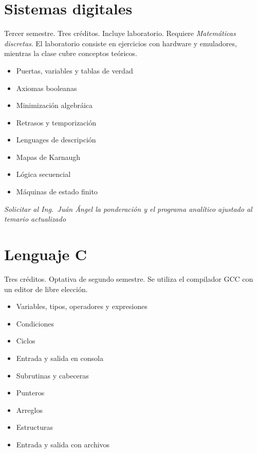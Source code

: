 \documentclass{article}
\begin{document}
\begin{multicols}{4}
\vfill\null \columnbreak

\hypertarget{sd}{\section*{Sistemas digitales}}

Tercer semestre. Tres cr\'{e}ditos. Incluye laboratorio. Requiere {\em
  Matem\'{a}ticas discretas}. El laboratorio consiste en ejercicios
con hardware y emuladores, mientras la clase cubre conceptos te\'{o}ricos.

\begin{itemize}
\item{Puertas, variables y tablas de verdad}
\item{Axiomas booleanas}
\item{Minimizaci\'{o}n algebr\'{a}ica}
\item{Retrasos y temporizaci\'{o}n}
\item{Lenguages de descripci\'{o}n}
\item{Mapas de Karnaugh}
\item{L\'{o}gica secuencial}
\item{M\'{a}quinas de estado finito}
\end{itemize}

{\em Solicitar al Ing.\ Ju\'{a}n \'{A}ngel la ponderaci\'{o}n y el programa
  anal\'{i}tico ajustado al temario actualizado}

\newpage

\hypertarget{lac}{\section*{Lenguaje C}}

Tres cr\'{e}ditos. Optativa de segundo semestre. Se utiliza el
compilador GCC con un editor de libre elecci\'{o}n.

\begin{itemize}
\item{Variables, tipos, operadores y expresiones}
\item{Condiciones}
\item{Ciclos}
\item{Entrada y salida en consola}
\item{Subrutinas y cabeceras}
\item{Punteros}
\item{Arreglos}
\item{Estructuras}
\item{Entrada y salida con archivos}  
\end{itemize}


\end{multicols}
\end{document}
